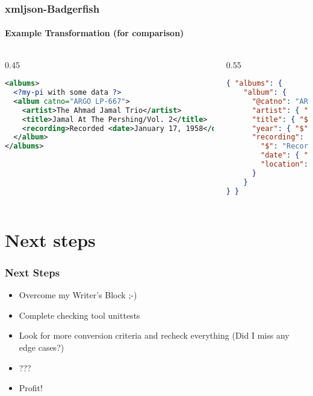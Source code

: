 \documentclass[
    alternativetitlepage=alternativ,
    cornerlogo=hgi_nds_logo2,
    sectionoverview,
]{rubpresentation}
\begin{document}
\begin{frame}[fragile]
    \frametitle{xmljson-Badgerfish}
    \framesubtitle{Example Transformation (for comparison)}
    \begin{columns}[t]
        \begin{column}{0.45\textwidth}
                \begin{lstlisting}[language=xml,basicstyle=\fontsize{7}{11}\ttfamily,numbers=none]
<albums>
  <?my-pi with some data ?>
  <album catno="ARGO LP-667">
    <artist>The Ahmad Jamal Trio</artist>
    <title>Jamal At The Pershing/Vol. 2</title>
    <recording>Recorded <date>January 17, 1958</date>, in live performance at the <location>Pershing Lounge, Chicago</location>.</recording>
  </album>
</albums>
\end{lstlisting}
        \end{column}
        \begin{column}{0.55\textwidth}
                \begin{lstlisting}[language=json,basicstyle=\fontsize{7}{11}\ttfamily,numbers=none]
{ "albums": {
    "album": {
      "@catno": "ARGO LP-667",
      "artist": { "$": "The Ahmad Jamal Trio" },
      "title": { "$": "Jamal At The Pershing/Vol. 2" },
      "year": { "$": 1960 },
      "recording": {
        "$": "Recorded",
        "date": { "$": "January 17, 1958" },
        "location": { "$": "Pershing Lounge, Chicago" }
      }
    }
} }
\end{lstlisting}
        \end{column}
    \end{columns}
\end{frame}
\section{Next steps}

\begin{frame}
    \frametitle{Next Steps}
    \begin{itemize}
        \item{} Overcome my Writer's Block ;-)
        \item{} Complete checking tool unittests
        \item{} Look for more conversion criteria and recheck everything (Did I miss any edge cases?)
        \item{} ???
        \item{} Profit!
    \end{itemize}
\end{frame}
\end{document}
